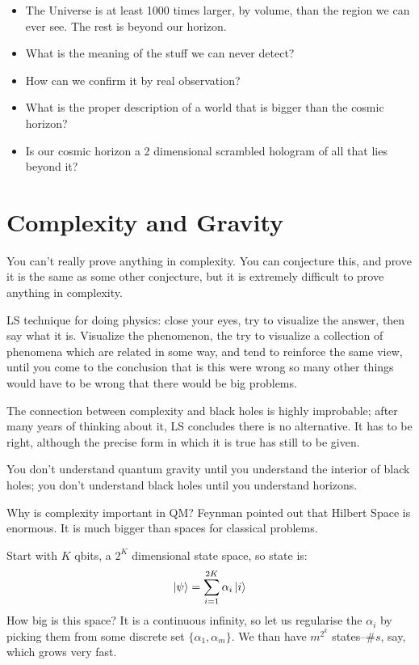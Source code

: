 \documentclass[]{article}
\begin{document}
\begin{itemize}
	\item The Universe is at least 1000 times larger, by volume, than the region we can ever see. The rest is beyond our horizon.
	\item What is the meaning of the stuff we can never detect?
	\item How can we confirm it by real observation?
	\item What is the proper description of a world that is bigger than the cosmic horizon?
	\item Is our cosmic horizon a 2 dimensional scrambled hologram of all that lies beyond it? 
\end{itemize}

\section{Complexity and Gravity }

You can't really prove anything in complexity. You can conjecture this, and prove it is the same as some other conjecture, but it is extremely difficult to prove anything in complexity.\cite{susskind2018complexity}

LS technique for doing physics: close your eyes, try to visualize the answer, then say what it is. Visualize the phenomenon, the try to visualize a collection of phenomena which are related in some way, and tend to reinforce the same view, until you come to the conclusion that is this were wrong so many other things would have to be wrong that there would be big problems.

The connection between complexity and black holes is highly improbable; after many years of thinking about it, LS concludes there is no alternative. It has to be right, although the precise form in which it is true has still to be given.

You don't understand quantum gravity until you understand the interior of black holes; you don't understand black holes until you understand horizons.

Why is complexity important in QM? Feynman pointed out that Hilbert Space is enormous. It is much bigger than spaces for classical problems.



Start with $K$ qbits,  a $2^K$ dimensional state space, so state is:
\begin{align*}
	\ket{\psi}=\sum_{i=1}^{2K}\alpha_i \ket{i}
\end{align*}
How big is this space? It is a continuous infinity, so let us regularise the $\alpha_i$ by picking them from some discrete set $\{\alpha_1, \alpha_m\}$. We than have $m^{2^k}$ states--$\#s$, say, which grows very fast.
\end{document}
